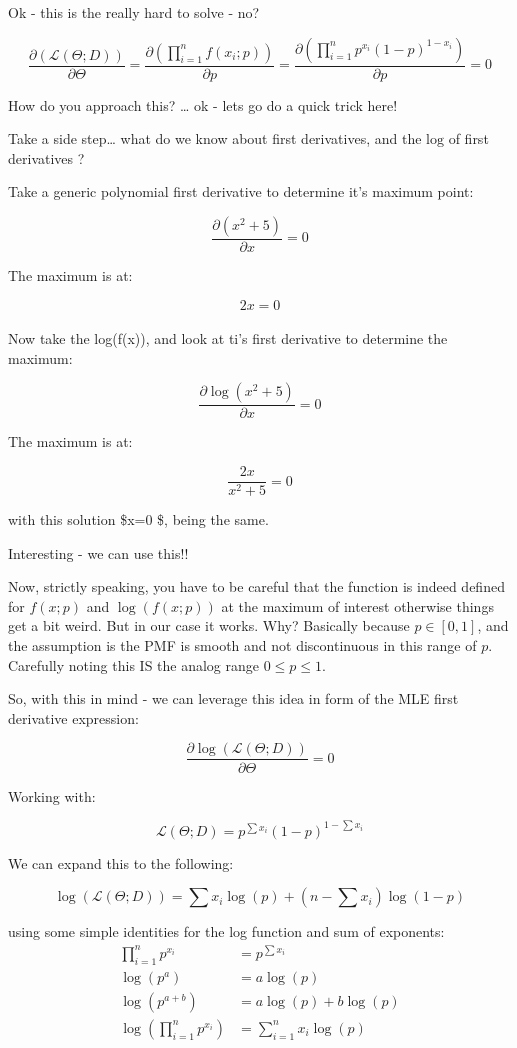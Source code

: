 \documentclass[
  12 pt,
  a4paper,
]{book}
\numberwithin{equation}{section}
\theoremstyle{plain}      %
\theoremstyle{definition} %
\theoremstyle{remark}     %
\theoremstyle{note}         %
\begin{document}
Ok - this is the really hard to solve - no?

\[
\frac{\partial (\mathcal{L}(\Theta ; D))}{\partial \Theta}=
\frac{\partial (\prod_{i=1}^{n} f\left(x_{i} ; p\right))}{\partial p}=
\frac{\partial (\prod_{i=1}^{n} p^{x_{i}}(1-p)^{1-x_{i}})}{\partial p}=0
\]

How do you approach this? \ldots{} ok - lets go do a quick trick here!

Take a side step\ldots{} what do we know about first derivatives, and
the \(\text{log}\) of first derivatives ?

Take a generic polynomial first derivative to determine it's maximum
point:

\[
\frac{\partial\left(x^{2}+5\right)}{\partial x}=0
\]

The maximum is at:

\[
2 x=0
\]\\

Now take the log(f(x)), and look at ti's first derivative to determine
the maximum:

\[
\frac{\partial \log \left(x^{2}+5\right)}{\partial x}=0
\]

The maximum is at:

\[
\frac{2 x}{x^{2}+5}=0
\]

with this solution \$x=0 \$, being the same.

Interesting - we can use this!!

Now, strictly speaking, you have to be careful that the function is
indeed defined for \(f(x;p)\) and \(\log (f(x;p))\) at the maximum of
interest otherwise things get a bit weird. But in our case it works.
Why? Basically because \(p \in [0,1]\), and the assumption is the PMF is
smooth and not discontinuous in this range of \(p\). Carefully noting
this IS the analog range \(0 \leq p \leq 1\).

So, with this in mind - we can leverage this idea in form of the MLE
first derivative expression:

\[
\frac{\partial \log (\mathcal{L}(\Theta ; D))}{\partial \Theta}=0
\]

Working with:

\[
\mathcal{L}(\Theta ; D)=p^{\sum x_{i}}(1-p)^{1-\sum x_{i}}
\]

We can expand this to the following:

\[
\log (\mathcal{L}(\Theta ; D))
=\sum x_{i} \log (p)+\left(n-\sum x_{i}\right) \log (1-p)
\]

using some simple identities for the log function and sum of exponents:
\[
\begin{aligned}
\prod_{i=1}^{n} p^{x_{i}}&=p^{\sum x_{i}} \\
\log \left(p^{a}\right)&=a \log (p) \\
\log \left(p^{a+b}\right)&=a \log (p)+b \log (p) \\
\log \left(\prod_{i=1}^{n} p^{x_{i}}\right)&=\sum_{i=1}^{n} x_{i} \log (p) 
\end{aligned}
\]
\end{document}
